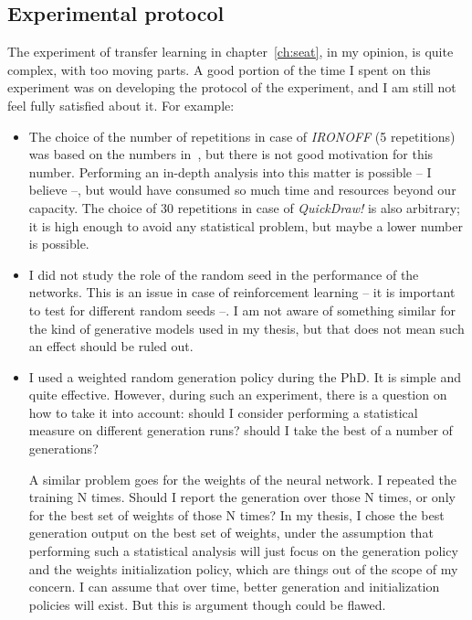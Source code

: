   \subsection{Experimental protocol}
    \par The experiment of transfer learning in chapter~\ref{ch:seat}, in my opinion, is quite complex, with too moving parts. A good portion of the time I spent on this experiment was on developing the protocol of the experiment, and I am still not feel fully satisfied about it. For example:
    \begin{itemize}
      \item The choice of the number of repetitions in case of \textit{IRONOFF} (5 repetitions) was based on the numbers in~\citep{8686063}, but there is not good motivation for this number. Performing an in-depth analysis into this matter is possible -- I believe --, but would have consumed so much time and resources beyond our capacity. The choice of 30 repetitions in case of \textit{QuickDraw!} is also arbitrary; it is high enough to avoid any statistical problem, but maybe a lower number is possible.

      \item I did not study the role of the random seed in the performance of the networks. This is an issue in case of reinforcement learning -- it is important to test for different random seeds --. I am not aware of something similar for the kind of generative models used in my thesis, but that does not mean such an effect should be ruled out.

      \item I used a weighted random generation policy during the PhD. It is simple and quite effective. However, during such an experiment, there is a question on how to take it into account: should I consider performing a statistical measure on different generation runs? should I take the best of a number of generations?

      A similar problem goes for the weights of the neural network. I repeated the training N times. Should I report the generation over those N times, or only for the best set of weights of those N times? In my thesis, I chose the best generation output on the best set of weights, under the assumption that performing such a statistical analysis will just focus on the generation policy and the weights initialization policy, which are things out of the scope of my concern. I can assume that over time, better generation and initialization policies will exist. But this is argument though could be flawed.


\end{itemize}

